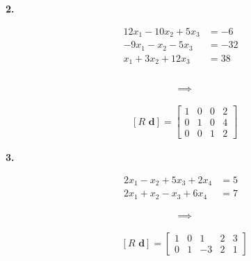 \documentclass[12pt]{amsart}
\newcommand{\bd}{\mathbf{d}}
\newcommand{\prob}[1]{\bigskip\noindent\textbf{#1.}\quad }
\begin{document}
\prob{2}  
\begin{minipage}[t]{3in}
\begin{align*}
12 x_1 - 10 x_2 + 5 x_3 &= -6 \\
- 9 x_1 - x_2 - 5 x_3 &= -32 \\
x_1 + 3 x_2 + 12 x_3 &= 38
\end{align*}
\end{minipage}
\begin{minipage}[t]{1in}
\begin{align*}
&\phantom{x} \\
&\implies
\end{align*}
\end{minipage}
\begin{minipage}[t]{3in}
\medskip

\begin{align*}
&[R\,\,\bd] = \begin{bmatrix} 1 & 0 & 0 & 2 \\ 0 & 1 & 0 & 4 \\ 0 & 0 & 1 & 2 \end{bmatrix}
\end{align*}\end{minipage}
\vfill

\clearpage \newpage
\prob{3}
\begin{minipage}[t]{3in}
\begin{align*}
2 x_1 - x_2 + 5 x_3 + 2 x_4 &= 5 \\
2 x_1 + x_2 - x_3 + 6 x_4 &= 7
\end{align*}
\end{minipage}
\begin{minipage}[t]{1in}
\begin{align*}
&\implies
\end{align*}
\end{minipage}
\begin{minipage}[t]{3in}
\medskip

\begin{align*}
&[R\,\,\bd] = \begin{bmatrix} 1 & 0 & 1 & 2 & 3 \\ 0 & 1 & -3 & 2 & 1 \end{bmatrix}
\end{align*}\end{minipage}
\vfill
\end{document}
